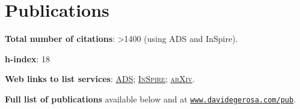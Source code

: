 \documentclass[a4paper]{moderncv}
\begin{document}
\section{Publications}

\textcolor{mark_color}{\textbf{Total number of citations}}:  {>1400}  (using ADS and InSpire).

\textcolor{mark_color}{\textbf{h-index}}: 18

\textcolor{mark_color}{\textbf{Web links to list services}}:
\href{https://ui.adsabs.harvard.edu/search/fq=%7B!type%3Daqp%20v%3D%24fq_doctype%7D&fq_doctype=(doctype%3A%22misc%22%20OR%20doctype%3A%22inproceedings%22%20OR%20doctype%3A%22article%22%20OR%20doctype%3A%22eprint%22)&q=%20author%3A%22Gerosa%2C%20Davide%22&sort=citation_count%20desc%2C%20bibcode%20desc&p_=0}{\textsc{ADS}};
\href{http://inspirehep.net/search?ln=en&ln=en&p=exactauthor%3AD.Gerosa.1&of=hb&action_search=Search&sf=&so=d&rm=citation&rg=25&sc=0}{\textsc{InSpire}};
\href{http://arxiv.org/a/gerosa_d_1.html}{\textsc{arXiv}}.

\textbf{Full list of publications} available below and at \href{http://www.davidegerosa.com/pub}{\texttt{www.davidegerosa.com/pub}}.



\end{document}

